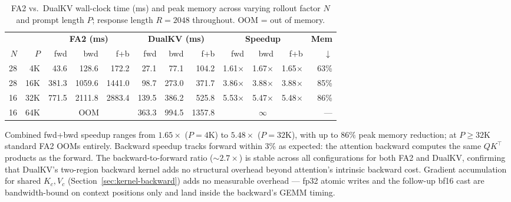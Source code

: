 \documentclass{article}
\begin{document}
\vspace{-1em}
\begin{table}[ht]
\centering
\scriptsize
\caption{FA2 vs.\ DualKV wall-clock time (ms) and peak memory across varying rollout factor $N$ and prompt length $P$; response length $R{=}2048$ throughout. OOM = out of memory.}
\label{tab:benchmark-fwdbwd}
\begin{tabular}{@{}rr|rrr|rrr|rrr|r@{}}
\toprule
& & \multicolumn{3}{c|}{\textbf{FA2 (ms)}} & \multicolumn{3}{c|}{\textbf{DualKV (ms)}} & \multicolumn{3}{c|}{\textbf{Speedup}} & \textbf{Mem} \\
$N$ & $P$ & fwd & bwd & f+b & fwd & bwd & f+b & fwd & bwd & f+b & $\downarrow$ \\
\midrule
28 & 4K   & 43.6  & 128.6  & 172.2  & 27.1  & 77.1   & 104.2  & 1.61$\times$ & 1.67$\times$ & 1.65$\times$ & 63\% \\
28 & 16K  & 381.3 & 1059.6 & 1441.0 & 98.7  & 273.0  & 371.7  & 3.86$\times$ & 3.88$\times$ & 3.88$\times$ & 85\% \\
16 & 32K  & 771.5 & 2111.8 & 2883.4 & 139.5 & 386.2  & 525.8  & 5.53$\times$ & 5.47$\times$ & 5.48$\times$ & 86\% \\
16 & 64K  & \multicolumn{3}{c|}{OOM} & 363.3 & 994.5  & 1357.8 & \multicolumn{3}{c|}{$\infty$} & --- \\
\bottomrule
\end{tabular}
\end{table}

Combined fwd+bwd speedup ranges from $1.65\times$ ($P{=}4\text{K}$) to $5.48\times$ ($P{=}32\text{K}$), with up to $86\%$ peak memory reduction; at $P{\geq}32\text{K}$ standard FA2 OOMs entirely. Backward speedup tracks forward within $3\%$ as expected: the attention backward computes the same $QK^\top$ products as the forward. The backward-to-forward ratio (${\sim}2.7\times$) is stable across all configurations for both FA2 and DualKV, confirming that DualKV's two-region backward kernel adds no structural overhead beyond attention's intrinsic backward cost. Gradient accumulation for shared $K_c, V_c$ (Section~\ref{sec:kernel-backward}) adds no measurable overhead --- fp32 atomic writes and the follow-up bf16 cast are bandwidth-bound on context positions only and land inside the backward's GEMM timing.
\end{document}

